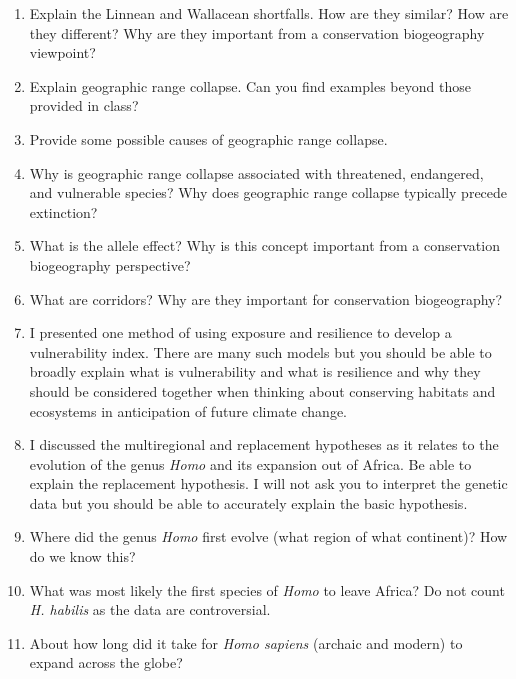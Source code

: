 \documentclass[letterpaper]{tufte-handout}
\begin{document}
\begin{enumerate}
		\item Explain the Linnean and Wallacean shortfalls. How are they similar? How are they different? Why are they important from a conservation biogeography viewpoint?
	
	\item Explain geographic range collapse. Can you find examples beyond those provided in class?
	
	\item Provide some possible causes of geographic range collapse.
	
	\item Why is geographic range collapse associated with threatened, endangered, and vulnerable species? Why does geographic range collapse typically precede extinction?
	
	\item What is the allele effect? Why is this concept important from a conservation biogeography perspective?
	
	\item What are corridors? Why are they important for conservation biogeography?
	
	\item I presented one method of using exposure and resilience to develop a vulnerability index. There are many such models but you should be able to broadly explain what is vulnerability and what is resilience and why they should be considered together when thinking about conserving habitats and ecosystems in anticipation of future climate change.
	
	\item I discussed the multiregional and replacement hypotheses as it relates to the evolution of the genus \textit{Homo} and its expansion out of Africa. Be able to explain the replacement hypothesis. I will not ask you to interpret the genetic data but you should be able to accurately explain the basic hypothesis.
	
	\item Where did the genus \textit{Homo} first evolve (what region of what continent)? How do we know this?
	
	\item What was most likely the first species of \textit{Homo} to leave Africa? Do not count \textit{H. habilis} as the data are controversial.	
	
	\item About how long did it take for \textit{Homo sapiens} (archaic and modern) to expand across the globe?
	

\end{enumerate}
\end{document}
